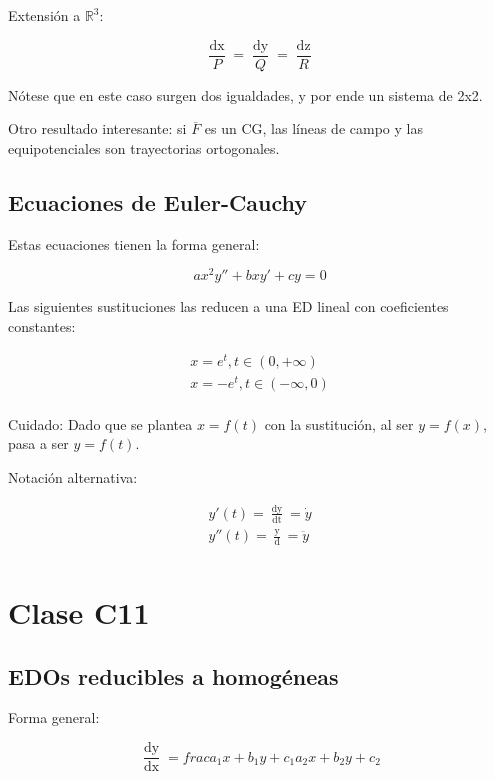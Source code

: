 \documentclass{article}
\renewcommand{\Bbb}{\mathbb}
\begin{document}
Extensión a $\Bbb R^3$:

\begin{equation}
\frac{\mathop{dx}}{P} = \frac{\mathop{dy}}{Q} = \frac{\mathop{dz}}{R}
\end{equation}

Nótese que en este caso surgen dos igualdades, y por ende un sistema de 2x2.

Otro resultado interesante: si $\overline{F}$ es un CG, las líneas de campo y las equipotenciales son trayectorias ortogonales.

\subsection{Ecuaciones de Euler-Cauchy}

Estas ecuaciones tienen la forma general:

\begin{equation}
a x^2 y'' + b x y' + c y = 0
\end{equation}

Las siguientes sustituciones las reducen a una ED lineal con coeficientes constantes:

\begin{align}
x = e^t, t \in (0, +\infty) \\
x = -e^t, t \in (-\infty, 0) \\
\end{align}

Cuidado: Dado que se plantea $x = f(t)$ con la sustitución, al ser $y=f(x)$, pasa a ser $y = f(t)$.

Notación alternativa: 

\begin{align}
y'(t) = \frac{\mathop{dy}}{\mathop{dt}} = \dot{y} \\
y''(t) = \frac{\mathop{d^2y}}{\mathop{dt^2}} = \ddot{y} \\
\end{align}

\section{Clase C11}

\subsection{EDOs reducibles a homogéneas}

Forma general:

\begin{equation}
\frac{\mathop{dy}}{\mathop{dx}} = frac{a_1 x + b_1 y + c_1}{a_2 x + b_2 y + c_2 }
\end{equation}
\end{document}

